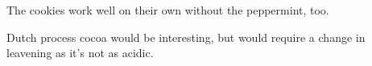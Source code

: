 \begin{variation}
\item The cookies work well on their own without the peppermint, too.
\end{variation}

\begin{experiments}
\item Dutch process cocoa would be interesting, but would require a change in leavening as it's not as acidic.
\end{experiments}

\recipeend%
